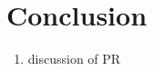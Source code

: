 \section{Conclusion}
\label{sec_conclusion}

\begin{enumerate}
\item discussion of PR
\end{enumerate}
